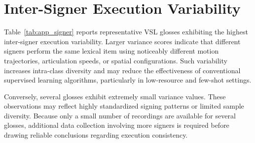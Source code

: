 \documentclass{ieeeaccess}
\begin{document}
\vspace{-8pt}
\section{Inter-Signer Execution Variability}

Table~\ref{tab:app_signer} reports representative VSL glosses exhibiting the highest inter-signer execution variability. Larger variance scores indicate that different signers perform the same lexical item using noticeably different motion trajectories, articulation speeds, or spatial configurations. Such variability increases intra-class diversity and may reduce the effectiveness of conventional supervised learning algorithms, particularly in low-resource and few-shot settings.

Conversely, several glosses exhibit extremely small variance values. These observations may reflect highly standardized signing patterns or limited sample diversity. Because only a small number of recordings are available for several glosses, additional data collection involving more signers is required before drawing reliable conclusions regarding execution consistency.
\end{document}
